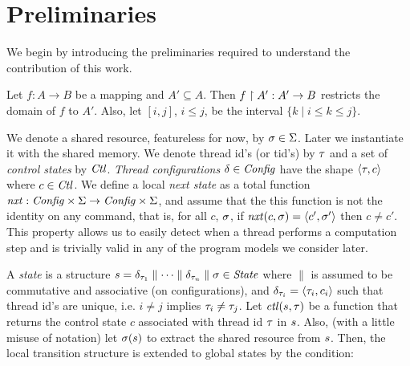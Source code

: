 \section{Preliminaries}
\label{sec:ModelStructure}
We begin by introducing the preliminaries required to understand the contribution of this work.

Let $f:A\rightarrow B$ be a mapping and $A'\subseteq A$. Then $f\upharpoonright A':A' \rightarrow B$ restricts the domain of $f$ to $A'$.
Also, let $[i,j]$, $i\leq j$, be the interval $\{k\mid i\leq k \leq j\}$.

%
We denote a shared resource, featureless for now, by $\sigma\in\Sigma$. Later we instantiate it with the shared memory. We denote thread id's (or tid's) by $\tau$ and a set of \emph{control states} by $\mathit{Ctl}$. \emph{Thread configurations} $\delta\in\mathit{Config}$ have the shape $\langle\tau,c\rangle$ where $c\in \mathit{Ctl}$. 
We define a local \textit{next state} as a total function $\mathit{nxt}:\mathit{Config} \times \Sigma \rightarrow \mathit{Config} \times \Sigma$, and assume that the
this function is not the identity on any command, that is, for all $c$, $\sigma$, if $\mathit{nxt}(c,\sigma) = \langle c',\sigma'\rangle$ then $c\neq c'$. This property allows us to easily detect when a thread performs a computation step and is trivially valid in any of the program models we consider later.

A \emph{state} is a structure $s = \delta_{\tau_1} \parallel \cdots \parallel \delta_{\tau_n}\parallel \sigma \in \mathit{State}$ where $\parallel$ is assumed to be commutative and associative (on configurations), and $\delta_{\tau_i}=\langle \tau_i,c_i\rangle$ such that thread id's are unique, i.e. $i\neq j$ implies $\tau_i\neq \tau_j$. Let $\mathit{ctl}(s,\tau)$ be a function that returns the control state $c$ associated with thread id $\tau$ in $s$. Also, (with a little misuse of notation) let $\sigma(s)$ to extract the shared resource from $s$. Then, the local transition structure is extended to global states by the condition:

